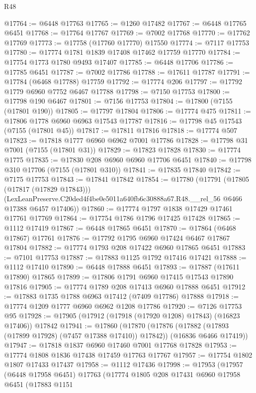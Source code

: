 \begin{lexlean}{R48}
\begin{coremodule}
@17764 := @6448 @17763
@17765 := @1260 @17482
@17767 := @6448 @17765 @6451
@17768 := @17764 @17767
@17769 := @7002 @17768
@17770 := @17762 @17769
@17773 := @17758 (@17760 @17770) @17550
@17774 := @7117 @17753
@17780 := @17774 @1781 @1839 @17408 @17462 @17759 @17770
@17784 := @17754 @1773 @1780 @9493 @17407
@17785 := @6448 @17706
@17786 := @17785 @6451
@17787 := @7002 @17786
@17788 := @17611 @17787
@17791 := @17784 (@6468 @17788) @17759
@17792 := @17774 @206
@17797 := @17792 @1779 @6960 @7752 @6467 @17788
@17798 := @7150 @17753
@17800 := @17798 @190 @6467
@17801 := @7156 @17753
@17804 := @17800 (@7155 (@17801 @190))
@17805 := @17797 @17804
@17806 := @17774 @475
@17811 := @17806 @1778 @6960 @6963 @17543 @17787
@17816 := @17798 @45 @17543 (@7155 (@17801 @45))
@17817 := @17811 @17816
@17818 := @17774 @507
@17823 := @17818 @1777 @6960 @6962 @7001 @17786
@17828 := @17798 @31 @7001 (@7155 (@17801 @31))
@17829 := @17823 @17828
@17830 := @17774 @1775
@17835 := @17830 @208 @6960 @6960 @17706 @6451
@17840 := @17798 @310 @17706 (@7155 (@17801 @310))
@17841 := @17835 @17840
@17842 := @7175 @17753
@17843 := @17841 @17842
@17854 := @17780
    (@17791
      (@17805 (@17817 (@17829 @17843)))
      (LexLeanPreserve.C20ded4f4be0e5011a640fb6c30888a67.R48.__rel_56 @6466 @17388 @6457 @17406))
@17860 := @17774 @1797 @1838 @17429 @17461 @17761 @17769
@17864 := @17754 @1786 @1796 @17425 @17428
@17865 := @1112 @17419
@17867 := @6448 @17865 @6451
@17870 := @17864 (@6468 @17867) @17761
@17876 := @17792 @1795 @6960 @17424 @6467 @17867 @17804
@17882 := @17774 @1793 @208 @17422 @6960 @17865 @6451
@17883 := @7101 @17753
@17887 := @17883 @1125 @1792 @17416 @17421
@17888 := @1112 @17410
@17890 := @6448 @17888 @6451
@17893 := @17887 (@17611 @17890) @17865
@17899 := @17806 @1791 @6960 @17415 @17543 @17890 @17816
@17905 := @17774 @1789 @208 @17413 @6960 @17888 @6451
@17912 := @17883 @1735 @1788 @6963 @17412 (@7409 @17786) @17888
@17918 := @17774 @1209 @1777 @6960 @6962 @1208 @17786
@17920 := @7126 @17753 @95
@17928 := @17905 (@17912 (@17918 (@17920 @1208) @17843) (@16823 @17406)) @17842
@17941 := @17860
    (@17870
      (@17876 (@17882 (@17893 (@17899 @17928) (@7457 @17388 @17410)) @17842))
      (@16836 @6466 @17419))
@17947 := @17818 @1837 @6960 @17460 @7001 @17768 @17828
@17953 := @17774 @1808 @1836 @17438 @17459 @17763 @17767
@17957 := @17754 @1802 @1807 @17433 @17437
@17958 := @1112 @17436
@17998 := @17953
    (@17957
      (@6448 @17958 @6451)
      @17763
      (@17774
        @1805
        @208
        @17431
        @6960
        @17958
        @6451
        (@17883
          @1151

\end{coremodule}
\end{lexlean}
